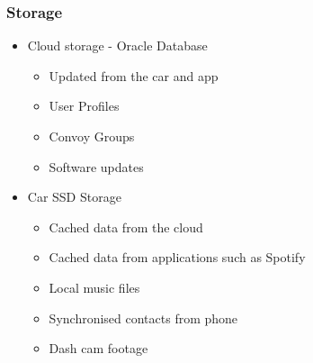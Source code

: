 \documentclass{article}
\begin{document}
\subsubsection{Storage}
  \begin{itemize}
      \item Cloud storage - Oracle Database
          \begin{itemize}
          	  \item Updated from the car and app
              \item User Profiles
              \item Convoy Groups
              \item Software updates
          \end{itemize}
      \item Car SSD Storage
      \begin{itemize}
      		\item Cached data from the cloud
            \item Cached data from applications such as Spotify
            \item Local music files
            \item Synchronised contacts from phone
            \item Dash cam footage
      \end{itemize}
  \end{itemize}
\end{document}
